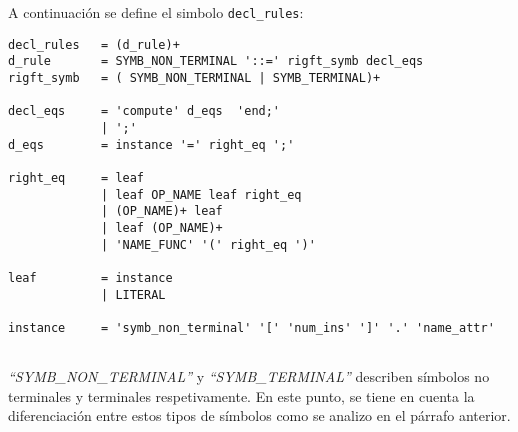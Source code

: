 A continuación se define el simbolo \texttt{decl\_rules}:
\begin{center}
\lstset{language=inform}
\scriptsize
\begin{lstlisting}[frame=single]
decl_rules   = (d_rule)+ 
d_rule       = SYMB_NON_TERMINAL '::=' rigft_symb decl_eqs
rigft_symb   = ( SYMB_NON_TERMINAL | SYMB_TERMINAL)+

decl_eqs     = 'compute' d_eqs  'end;'
             | ';'
d_eqs        = instance '=' right_eq ';'

right_eq     = leaf
             | leaf OP_NAME leaf right_eq
             | (OP_NAME)+ leaf
             | leaf (OP_NAME)+
             | 'NAME_FUNC' '(' right_eq ')' 

leaf         = instance
             | LITERAL

instance     = 'symb_non_terminal' '[' 'num_ins' ']' '.' 'name_attr'
            
\end{lstlisting}
\end{center}
\textit{``SYMB\_NON\_TERMINAL''} y \textit{``SYMB\_TERMINAL''} describen símbolos no terminales y terminales respetivamente. En este punto, se tiene en cuenta la diferenciación entre estos tipos de símbolos como se analizo en el párrafo anterior.
 
